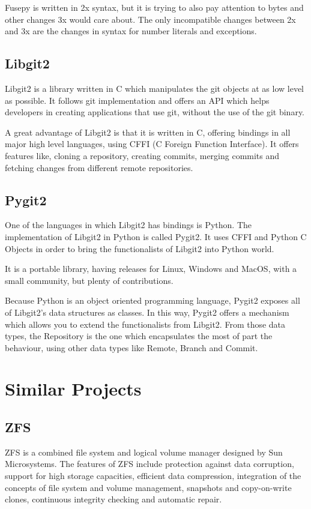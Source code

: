         Fusepy is written in 2x syntax, but it is trying to also pay attention to bytes and other changes 3x would care about. The only incompatible changes between 2x and 3x are the changes in syntax for number literals and exceptions.
    \subsection{Libgit2}
        Libgit2 is a library written in C which manipulates the git objects at as low level as possible. It follows git implementation and offers an API which helps developers in creating applications that use git, without the use of the git binary.
        
        A great advantage of Libgit2 is that it is written in C, offering bindings in all major high level languages, using CFFI (C Foreign Function Interface). It offers features like, cloning a repository, creating commits, merging commits and fetching changes from different remote repositories.
        
    \subsection{Pygit2}
        One of the languages in which Libgit2 has bindings is Python. The implementation of Libgit2 in Python is called Pygit2. It uses CFFI and Python C Objects in order to bring the functionalists of Libgit2 into Python world.
        
        It is a portable library, having releases for Linux, Windows and MacOS, with a small community, but plenty of contributions.
        
        Because Python is an object oriented programming language, Pygit2 exposes all of Libgit2's data structures as classes. In this way, Pygit2 offers a mechanism which allows you to extend the functionalists from Libgit2. From those data types, the Repository is the one which encapsulates the most of part the behaviour, using other data types like Remote, Branch and Commit.
    
\section{Similar Projects}
    \subsection{ZFS}
        ZFS is a combined file system and logical volume manager designed by Sun Microsystems. The features of ZFS include protection against data corruption, support for high storage capacities, efficient data compression, integration of the concepts of file system and volume management, snapshots and copy-on-write clones, continuous integrity checking and automatic repair.
        
